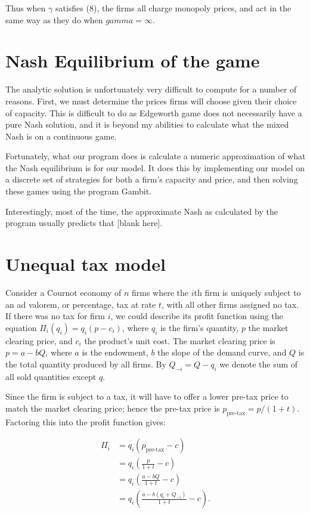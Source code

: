 \documentclass[11pt]{article}
\begin{document}
Thus when $\gamma$ satisfies (8), the firms all charge monopoly prices, and act
in the same way as they do when $gamma = \infty$.

\section{Nash Equilibrium of the game}
The analytic solution is unfortunately very difficult to compute for a number
of reasons. First, we must determine the prices firms will choose given their
choice of capacity. This is difficult to do as Edgeworth game does not
necessarily have a pure Nash solution, and it is beyond my abilities to
calculate what the mixed Nash is on a continuous game.  

Fortunately, what our program does is calculate a numeric approximation of what
the Nash equilibrium is for our model. It does this by implementing our model
on a discrete set of strategies for both a firm's capacity and price, and then
solving these games using the program Gambit.

Interestingly, most of the time, the approximate Nash as calculated by the
program usually predicts that [blank here].


\section{Unequal tax model}
Consider a Cournot economy of $n$ firms where the $i$th firm is uniquely
subject to an ad valorem, or percentage, tax at rate $t$, with all other firms
assigned no tax. If there was no tax for firm $i$,  we could describe its
profit function using the equation $\Pi_i(q_i) = q_i(p-c_i)$, where $q_i$ is
the firm's quantity, $p$ the market clearing price, and $c_i$ the product's
unit cost.  The market clearing price is $p = a - bQ$, where $a$ is the
endowment, $b$ the slope of the demand curve, and $Q$ is the total quantity
produced by all firms. By $Q_{-i} = Q - q_i$ we denote the sum of all sold
quantities except $q$. 

Since the firm is subject to a tax, it will have to offer a lower pre-tax
price to match the market clearing price; hence the pre-tax price is
$p_\text{pre-tax} = p/(1+t)$. Factoring this into the profit function gives:

\begin{subequations}
\begin{align}
    \Pi_i &= q_i \left(p_\text{pre-tax} - c\right)\\
          &= q_i \left(\frac{p}{1+t} - c\right)\\
          &= q_i \left(\frac{a - bQ}{1+t} - c\right)\\
          &= q_i \left(\frac{a - b(q_i + Q_{-i})}{1+t} - c\right).
\end{align}
\end{subequations}
\end{document}
